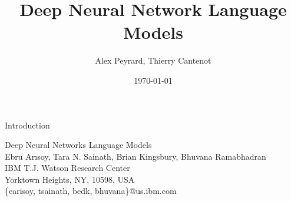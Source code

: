 \documentclass{beamer}
\title[DNNLM]{Deep Neural Network Language Models}
\author[A. Peyrard, T. Cantenot]{Alex Peyrard, Thierry Cantenot}
\institute{Shanghai JiaoTong University}
\date{\today}
\begin{document}
\begin{frame}[plain]
	  \titlepage
\end{frame}
\begin{frame}{Introduction}
\begin{center}
Deep Neural Networks Language Models\\
Ebru Arısoy, Tara N. Sainath, Brian Kingsbury, Bhuvana Ramabhadran\\
IBM T.J. Watson Research Center\\
Yorktown Heights, NY, 10598, USA\\
\{earisoy, tsainath, bedk, bhuvana\}@us.ibm.com
\end{center}

\end{frame}
\end{document}
